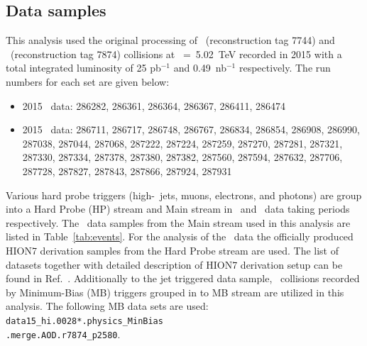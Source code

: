 
\subsection{Data samples}

This analysis used the original processing of \pp\ (reconstruction tag 7744) and \PbPb\ (reconstruction tag 7874) collisions at \sqrtsnn~=~5.02~TeV recorded in 2015 with a total integrated luminosity of 25 pb$^{-1}$ and 0.49~nb$^{-1}$ respectively. The run numbers for each set are given below:
\begin{itemize}
\item 2015 \pp\ data: 286282, 286361, 286364, 286367, 286411, 286474
\item 2015 \PbPb\ data: 286711, 286717, 286748, 286767, 286834, 286854, 286908, 286990, 287038, 287044, 287068, 287222, 287224, 287259, 287270, 287281, 287321, 287330, 287334, 287378, 287380, 287382, 287560, 287594, 287632, 287706, 287728, 287827, 287843, 287866, 287924, 287931
\end{itemize}


Various hard probe triggers (high-\pT\ jets, muons, electrons, and photons) are group into a Hard Probe (HP) stream and Main stream in \PbPb\ and \pp\ data taking periods respectively. The \pp\ data samples from the Main stream used in this analysis are listed in Table~\ref{tab:events}. For the analysis of the \pbpb\ data the officially produced HION7 derivation samples from the Hard Probe stream are used. The list of datasets together with detailed description of HION7 derivation setup can be found in Ref.~\cite{HIdataderviation}. Additionally to the jet triggered data sample, \PbPb\ collisions recorded by Minimum-Bias (MB) triggers grouped in to MB stream are utilized in this analysis. The following MB data sets are used: \texttt{data15\_hi.0028*.physics\_MinBias\\.merge.AOD.r7874\_p2580}.



